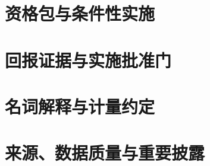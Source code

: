 \documentclass[a4paper,11pt,openany,fontset=none]{ctexrep}
\begin{document}
\chapter{资格包与条件性实施}


\chapter{回报证据与实施批准门}


\appendix
\begingroup
\small
\chapter{名词解释与计量约定}


\chapter{来源、数据质量与重要披露}

\endgroup
\end{document}
